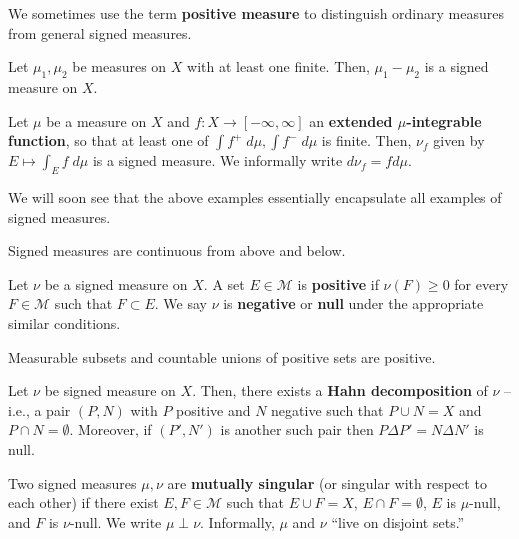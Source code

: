 \documentclass[11pt]{article}
\newcommand{\M}{\mathcal{M}}
\begin{document}
We sometimes use the term \textbf{positive measure} to distinguish ordinary measures from general signed measures.

\begin{example}
\hfill
\begin{enum}{\arabic}
\item Let $\mu_1,\mu_2$ be measures on $X$ with at least one finite. Then, $\mu_1-\mu_2$ is a signed measure on $X$.
\item Let $\mu$ be a measure on $X$ and $f: X\to[-\infty,\infty]$ an \textbf{extended $\mu$-integrable function}, so that at least one of $\int f^+\;d\mu,\int f^-\;d\mu$ is finite. Then, $\nu_f$ given by $E\mapsto\int_Ef\;d\mu$ is a signed measure. We informally write $d\nu_f=fd\mu$.
\end{enum}
\end{example}

We will soon see that the above examples essentially encapsulate all examples of signed measures.

\begin{proposition}
Signed measures are continuous from above and below.
\end{proposition}

\begin{definition}
Let $\nu$ be a signed measure on $X$. A set $E\in\M$ is \textbf{positive} if $\nu(F)\geq0$ for every $F\in\M$ such that $F\subset E$. We say $\nu$ is \textbf{negative} or \textbf{null} under the appropriate similar conditions.
\end{definition}

\begin{lemma}
Measurable subsets and countable unions of positive sets are positive.
\end{lemma}

\begin{theorem}
Let $\nu$ be signed measure on $X$. Then, there exists a \textbf{Hahn decomposition} of $\nu$ -- i.e., a pair $(P,N)$ with $P$ positive and $N$ negative such that $P\cup N=X$ and $P\cap N=\emptyset$. Moreover, if $(P',N')$ is another such pair then $P\Delta P'=N\Delta N'$ is null.
\end{theorem}

\begin{definition}
Two signed measures $\mu,\nu$ are \textbf{mutually singular} (or singular with respect to each other) if there exist $E,F\in\M$ such that $E\cup F=X$, $E\cap F=\emptyset$, $E$ is $\mu$-null, and $F$ is $\nu$-null. We write $\mu\perp\nu$. Informally, $\mu$ and $\nu$ ``live on disjoint sets.''
\end{definition}
\end{document}
